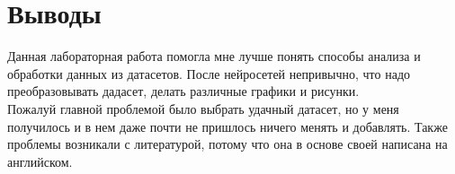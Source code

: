 \section{Выводы}

Данная лабораторная работа помогла мне лучше понять способы анализа и обработки данных из датасетов. После
нейросетей непривычно, что надо преобразовывать дадасет, делать различные
графики и рисунки.\\
Пожалуй главной проблемой было выбрать удачный датасет, но у меня получилось и в нем даже почти не пришлось ничего менять и добавлять. Также проблемы возникали с литературой, потому что она в основе своей написана на английском.


\pagebreak